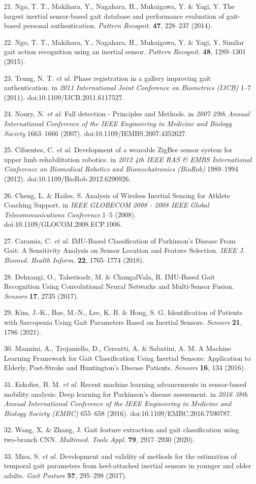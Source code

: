 \documentclass{article}
\begin{document}
21. Ngo, T. T., Makihara, Y., Nagahara, H., Mukaigawa, Y. \& Yagi, Y.
The largest inertial sensor-based gait database and performance
evaluation of gait-based personal authentication. \emph{Pattern
Recognit.} \textbf{47}, 228--237 (2014).

22. Ngo, T. T., Makihara, Y., Nagahara, H., Mukaigawa, Y. \& Yagi, Y.
Similar gait action recognition using an inertial sensor. \emph{Pattern
Recognit.} \textbf{48}, 1289--1301 (2015).

23. Trung, N. T. \emph{et al.} Phase registration in a gallery improving
gait authentication. in \emph{2011 International Joint Conference on
Biometrics (IJCB)} 1--7 (2011). doi:10.1109/IJCB.2011.6117527.

24. Noury, N. \emph{et al.} Fall detection - Principles and Methods. in
\emph{2007 29th Annual International Conference of the IEEE Engineering
in Medicine and Biology Society} 1663--1666 (2007).
doi:10.1109/IEMBS.2007.4352627.

25. Cifuentes, C. \emph{et al.} Development of a wearable ZigBee sensor
system for upper limb rehabilitation robotics. in \emph{2012 4th IEEE
RAS \& EMBS International Conference on Biomedical Robotics and
Biomechatronics (BioRob)} 1989--1994 (2012).
doi:10.1109/BioRob.2012.6290926.

26. Cheng, L. \& Hailes, S. Analysis of Wireless Inertial Sensing for
Athlete Coaching Support. in \emph{IEEE GLOBECOM 2008 - 2008 IEEE Global
Telecommunications Conference} 1--5 (2008).
doi:10.1109/GLOCOM.2008.ECP.1006.

27. Caramia, C. \emph{et al.} IMU-Based Classification of Parkinson's
Disease From Gait: A Sensitivity Analysis on Sensor Location and Feature
Selection. \emph{IEEE J. Biomed. Health Inform.} \textbf{22}, 1765--1774
(2018).

28. Dehzangi, O., Taherisadr, M. \& ChangalVala, R. IMU-Based Gait
Recognition Using Convolutional Neural Networks and Multi-Sensor Fusion.
\emph{Sensors} \textbf{17}, 2735 (2017).

29. Kim, J.-K., Bae, M.-N., Lee, K. B. \& Hong, S. G. Identification of
Patients with Sarcopenia Using Gait Parameters Based on Inertial
Sensors. \emph{Sensors} \textbf{21}, 1786 (2021).

30. Mannini, A., Trojaniello, D., Cereatti, A. \& Sabatini, A. M. A
Machine Learning Framework for Gait Classification Using Inertial
Sensors: Application to Elderly, Post-Stroke and Huntington's Disease
Patients. \emph{Sensors} \textbf{16}, 134 (2016).

31. Eskofier, B. M. \emph{et al.} Recent machine learning advancements
in sensor-based mobility analysis: Deep learning for Parkinson's disease
assessment. in \emph{2016 38th Annual International Conference of the
IEEE Engineering in Medicine and Biology Society (EMBC)} 655--658
(2016). doi:10.1109/EMBC.2016.7590787.

32. Wang, X. \& Zhang, J. Gait feature extraction and gait
classification using two-branch CNN. \emph{Multimed. Tools Appl.}
\textbf{79}, 2917--2930 (2020).

33. Misu, S. \emph{et al.} Development and validity of methods for the
estimation of temporal gait parameters from heel-attached inertial
sensors in younger and older adults. \emph{Gait Posture} \textbf{57},
295--298 (2017).
\end{document}

